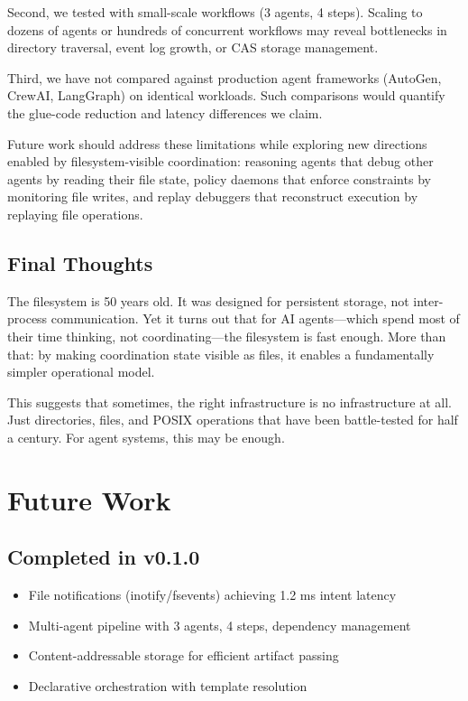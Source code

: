 \documentclass[11pt]{article}
\begin{document}
Second, we tested with small-scale workflows (3 agents, 4 steps). Scaling to dozens of agents or hundreds of concurrent workflows may reveal bottlenecks in directory traversal, event log growth, or CAS storage management.

Third, we have not compared against production agent frameworks (AutoGen, CrewAI, LangGraph) on identical workloads. Such comparisons would quantify the glue-code reduction and latency differences we claim.

Future work should address these limitations while exploring new directions enabled by filesystem-visible coordination: reasoning agents that debug other agents by reading their file state, policy daemons that enforce constraints by monitoring file writes, and replay debuggers that reconstruct execution by replaying file operations.

\subsection{Final Thoughts}

The filesystem is 50 years old. It was designed for persistent storage, not inter-process communication. Yet it turns out that for AI agents---which spend most of their time thinking, not coordinating---the filesystem is fast enough. More than that: by making coordination state visible as files, it enables a fundamentally simpler operational model.

This suggests that sometimes, the right infrastructure is no infrastructure at all. Just directories, files, and POSIX operations that have been battle-tested for half a century. For agent systems, this may be enough.

\section{Future Work}

\subsection{Completed in v0.1.0}

\begin{itemize}
\item[\checkmark] File notifications (inotify/fsevents) achieving 1.2 ms intent latency
\item[\checkmark] Multi-agent pipeline with 3 agents, 4 steps, dependency management
\item[\checkmark] Content-addressable storage for efficient artifact passing
\item[\checkmark] Declarative orchestration with template resolution
\end{itemize}
\end{document}
